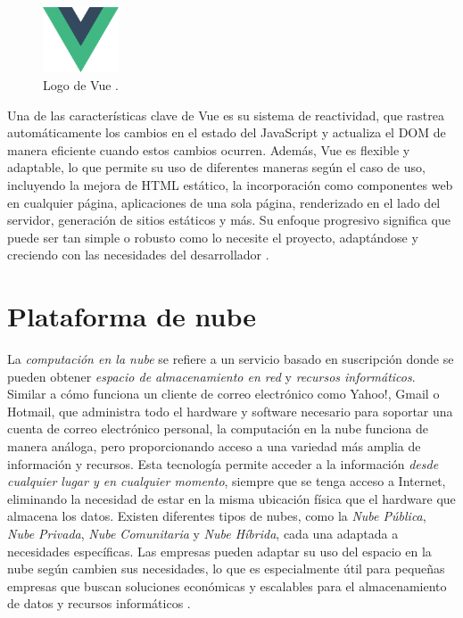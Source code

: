 \begin{figure}[!htbp]
  \centering
  \includegraphics[width=0.2\textwidth]{imagenes/02-marco-teorico/vue-logo.png}
  \caption[Logo de Vue]{Logo de Vue \cite{VuejsGuide2023}.}
  \label{fig:vue-logo}
\end{figure}

Una de las características clave de Vue es su sistema de reactividad, que rastrea
automáticamente los cambios en el estado del JavaScript y actualiza el DOM de
manera eficiente cuando estos cambios ocurren. Además, Vue es flexible y
adaptable, lo que permite su uso de diferentes maneras según el caso de uso,
incluyendo la mejora de HTML estático, la incorporación como componentes web en
cualquier página, aplicaciones de una sola página, renderizado en el lado del
servidor, generación de sitios estáticos y más. Su enfoque progresivo significa
que puede ser tan simple o robusto como lo necesite el proyecto, adaptándose y
creciendo con las necesidades del desarrollador \cite{VuejsGuide2023}.

\section{Plataforma de nube}

La \textit{computación en la nube} se refiere a un servicio basado en suscripción
donde se pueden obtener \textit{espacio de almacenamiento en red} y \textit{recursos informáticos}.
Similar a cómo funciona un cliente de correo electrónico como Yahoo!, Gmail o
Hotmail, que administra todo el hardware y software necesario para soportar
una cuenta de correo electrónico personal, la computación en la nube funciona
de manera análoga, pero proporcionando acceso a una variedad más amplia de
información y recursos. Esta tecnología permite acceder a la información
\textit{desde cualquier lugar y en cualquier momento}, siempre que se tenga
acceso a Internet, eliminando la necesidad de estar en la misma ubicación física
que el hardware que almacena los datos. Existen diferentes tipos de nubes, como
la \textit{Nube Pública}, \textit{Nube Privada}, \textit{Nube Comunitaria} y
\textit{Nube Híbrida}, cada una adaptada a necesidades específicas. Las empresas
pueden adaptar su uso del espacio en la nube según cambien sus necesidades, lo
que es especialmente útil para pequeñas empresas que buscan soluciones económicas
y escalables para el almacenamiento de datos y recursos informáticos \cite{huth2011basics}.


